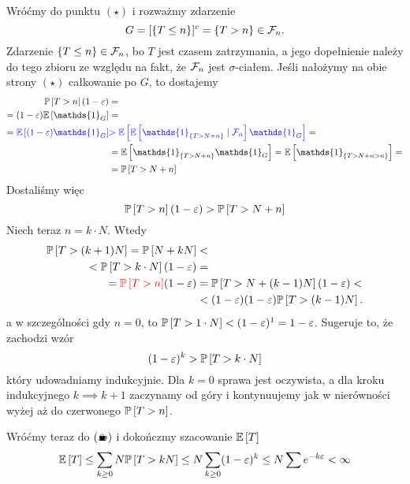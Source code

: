 \begin{solution}
  Wróćmy do punktu $(\star)$ i rozważmy zdarzenie 
  $$G=[\{T\leq n\}]^c=\{T>n\}\in\mathcal{F}_n.$$ 
  Zdarzenie $\{T\leq n\}\in\mathcal{F}_n$, bo $T$ jest czasem zatrzymania, a jego dopełnienie należy do tego zbioru ze względu na fakt, że $\mathcal{F}_n$ jest $\sigma$-ciałem. Jeśli nałożymy na obie strony $(\star)$ całkowanie po $G$, to dostajemy
  \begin{align*}
    \prob{T>n}(1-\varepsilon)&=\\=(1-\varepsilon)\expected{\mathds{1}_G}&=\\={\color{blue}\expected{(1-\varepsilon)\mathds{1}_G}}&{\color{blue}>\expected{\expected{\mathds{1}_{\{T> N+n\}}}{\set{F}_n}\mathds{1}_G} }=\\ 
                                                                                  &=\expected{\mathds{1}_{\{T> N+n\}}\mathds{1}_G}=\expected{\mathds{1}_{\{T>N+n>n\}}}=\\ 
                                                                                  &=\prob{T>N+n}
  \end{align*}
  Dostaliśmy więc
  $$\prob{T>n}(1-\varepsilon)>\prob{T>N+n}$$
  Niech teraz $n=k\cdot N$. Wtedy
  \begin{align*}
    \prob{T>(k+1)N}=\prob{N+kN}&<\\
    <\prob{T>k\cdot N}(1-\varepsilon)&=\\ 
    = {\color{red}\prob{T>n}}(1-\varepsilon)&=\prob{T>N+(k-1)N}(1-\varepsilon)<\\ 
                                                                             &<(1-\varepsilon)(1-\varepsilon)\prob{T>(k-1)N}.
  \end{align*}
  a w szczególności gdy $n=0$, to $\prob{T>1\cdot N}<(1-\varepsilon)^1=1-\varepsilon$. Sugeruje to, że zachodzi wzór%
  $$(1-\varepsilon)^k>\prob{T>k\cdot N}$$
  który udowadniamy indukcyjnie. Dla $k=0$ sprawa jest oczywista, a dla kroku indukcyjnego $k\implies k+1$ zaczynamy od góry i kontynuujemy jak w nierówności wyżej aż do czerwonego $\prob{T>n}$.

  Wróćmy teraz do $(\text{\Coffeecup})$ i dokończmy szacowanie $\expected{T}$
  $$\expected{T}\leq \sum_{k\geq 0}N\prob{T>kN}\leq N\sum_{k\geq 0}(1-\varepsilon)^k\leq N\sum e^{-k\varepsilon}<\infty$$
\end{solution}
